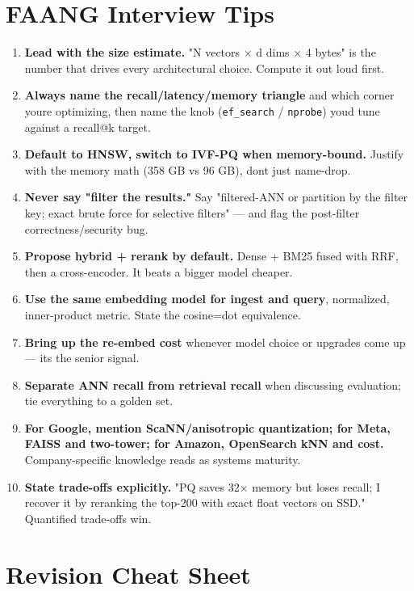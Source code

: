 \documentclass[11pt]{article}
\begin{document}
\section{FAANG Interview Tips}\label{faang-interview-tips}

\begin{enumerate}
\def\labelenumi{\arabic{enumi}.}
\item
  \textbf{Lead with the size estimate.} "N vectors \(\times\) d dims \(\times\) 4 bytes" is the number that drives every architectural choice. Compute it out loud first.
\item
  \textbf{Always name the recall/latency/memory triangle} and which corner you\textquotesingle re optimizing, then name the knob (\texttt{ef\_search} / \texttt{nprobe}) you\textquotesingle d tune against a recall@k target.
\item
  \textbf{Default to HNSW, switch to IVF-PQ when memory-bound.} Justify with the memory math (358 GB vs 96 GB), don\textquotesingle t just name-drop.
\item
  \textbf{Never say "filter the results."} Say "filtered-ANN or partition by the filter key; exact brute force for selective filters" --- and flag the post-filter correctness/security bug.
\item
  \textbf{Propose hybrid + rerank by default.} Dense + BM25 fused with RRF, then a cross-encoder. It beats a bigger model cheaper.
\item
  \textbf{Use the same embedding model for ingest and query}, normalized, inner-product metric. State the cosine=dot equivalence.
\item
  \textbf{Bring up the re-embed cost} whenever model choice or upgrades come up --- it\textquotesingle s the senior signal.
\item
  \textbf{Separate ANN recall from retrieval recall} when discussing evaluation; tie everything to a golden set.
\item
  \textbf{For Google, mention ScaNN/anisotropic quantization; for Meta, FAISS and two-tower; for Amazon, OpenSearch kNN and cost.} Company-specific knowledge reads as systems maturity.
\item
  \textbf{State trade-offs explicitly.} "PQ saves 32\(\times\) memory but loses recall; I recover it by reranking the top-200 with exact float vectors on SSD." Quantified trade-offs win.
\end{enumerate}

\section{Revision Cheat Sheet}\label{revision-cheat-sheet}
\end{document}
